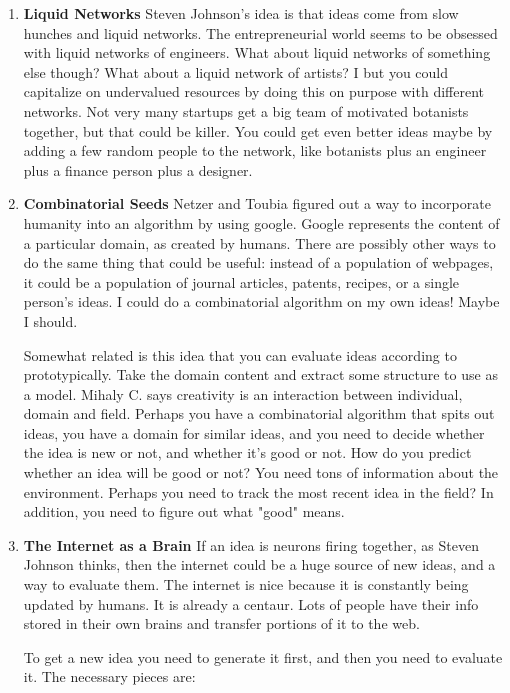 \documentclass[paper=a4, fontsize=11pt]{scrartcl} %
\numberwithin{equation}{section} %
\numberwithin{figure}{section} %
\numberwithin{table}{section} %
\begin{document}
\begin{enumerate}
\item \textbf{Liquid Networks} Steven Johnson's idea is that ideas come from slow hunches and liquid networks.  The entrepreneurial world seems to be obsessed with liquid networks of engineers.  What about liquid networks of something else though?  What about a liquid network of artists?  I but you could capitalize on undervalued resources by doing this on purpose with different networks.  Not very many startups get a big team of motivated botanists together, but that could be killer.  You could get even better ideas maybe by adding a few random people to the network, like botanists plus an engineer plus a finance person plus a designer.  

\item \textbf{Combinatorial Seeds} Netzer and Toubia figured out a way to incorporate humanity into an algorithm by using google.  Google represents the content of a particular domain, as created by humans.  There are possibly other ways to do the same thing that could be useful: instead of a population of webpages, it could be a population of journal articles, patents, recipes, or a single person's ideas.  I could do a combinatorial algorithm on my own ideas!  Maybe I should.  

Somewhat related is this idea that you can evaluate ideas according to prototypically.  Take the domain content and extract some structure to use as a model.  Mihaly C. says creativity is an interaction between individual, domain and field.  Perhaps you have a combinatorial algorithm that spits out ideas, you have a domain for similar ideas, and you need to decide whether the idea is new or not, and whether it's good or not.  How do you predict whether an idea will be good or not?  You need tons of information about the environment.  Perhaps you need to track the most recent idea in the field?  In addition, you need to figure out what "good" means.  

\item \textbf{The Internet as a Brain} If an idea is neurons firing together, as Steven Johnson thinks, then the internet could be a huge source of new ideas, and a way to evaluate them.  The internet is nice because it is constantly being updated by humans.  It is already a centaur.  Lots of people have their info stored in their own brains and transfer portions of it to the web.  

To get a new idea you need to generate it first, and then you need to evaluate it.  The necessary pieces are:


\end{enumerate}
\end{document}
